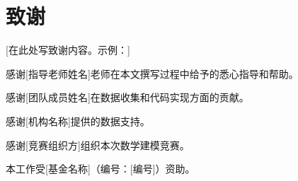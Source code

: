 
\section*{致谢}


[在此处写致谢内容。示例：]

感谢[指导老师姓名]老师在本文撰写过程中给予的悉心指导和帮助。

感谢[团队成员姓名]在数据收集和代码实现方面的贡献。

感谢[机构名称]提供的数据支持。

感谢[竞赛组织方]组织本次数学建模竞赛。

本工作受[基金名称]（编号：[编号]）资助。

\vspace{1cm}
\begin{flushright}
[作者姓名]\\
[日期]
\end{flushright}

